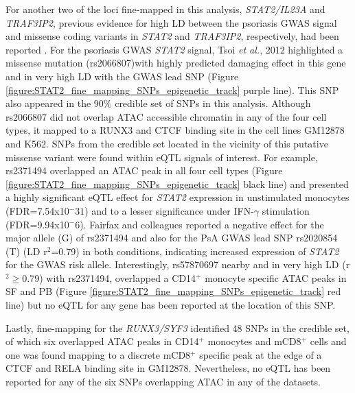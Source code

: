 For another two of the loci fine-mapped in this analysis, \textit{STAT2/IL23A} and \textit{TRAF3IP2}, previous evidence for high LD between the psoriasis GWAS signal and missense coding variants in \textit{STAT2} and \textit{TRAF3IP2}, respectively, had been reported \parencite{Tsoi2012}. For the psoriasis GWAS \textit{STAT2} signal, Tsoi \textit{et al.}, 2012 highlighted a missense mutation (rs2066807)with highly predicted damaging effect in this gene and in very high LD with the GWAS lead SNP (Figure \ref{figure:STAT2_fine_mapping_SNPs_epigenetic_track} purple line). This SNP also appeared in the 90\% credible set of SNPs in this analysis. Although rs2066807 did not overlap ATAC accessible chromatin in any of the four cell types, it mapped to a RUNX3 and CTCF binding site in the cell lines GM12878 and K562. SNPs from the credible set located in the vicinity of this putative missense variant were found within eQTL signals of interest. For example, rs2371494 overlapped an ATAC peak in all four cell types (Figure \ref{figure:STAT2_fine_mapping_SNPs_epigenetic_track} black line) and presented a highly significant eQTL effect for \textit{STAT2} expression in unstimulated monocytes (FDR=7.54x10${^-31}$) and to a lesser significance under IFN-$\gamma$ stimulation (FDR=9.94x10${^-6}$). Fairfax and colleagues reported a negative effect for the major allele (G) of rs2371494 and also for the PsA GWAS lead SNP rs2020854 (T) (LD r$^2$=0.79) in both conditions, indicating increased expression of \textit{STAT2} for the GWAS risk allele. Interestingly, rs57870697 nearby and in very high LD (r${^2}\geq$0.79) with rs2371494, overlapped a CD14$^+$ monocyte specific ATAC peaks in SF and PB (Figure \ref{figure:STAT2_fine_mapping_SNPs_epigenetic_track} red line) but no eQTL for any gene has been reported at the location of this SNP.


Lastly, fine-mapping for the \textit{RUNX3/SYF3} identified 48 SNPs in the credible set, of which six overlapped ATAC peaks in CD14$^+$ monocytes and mCD8$^+$ cells and one was found mapping to a discrete mCD8$^+$ specific peak at the edge of a CTCF and RELA binding site in GM12878. Nevertheless, no eQTL has been reported for any of the six SNPs overlapping ATAC in any of the datasets.



